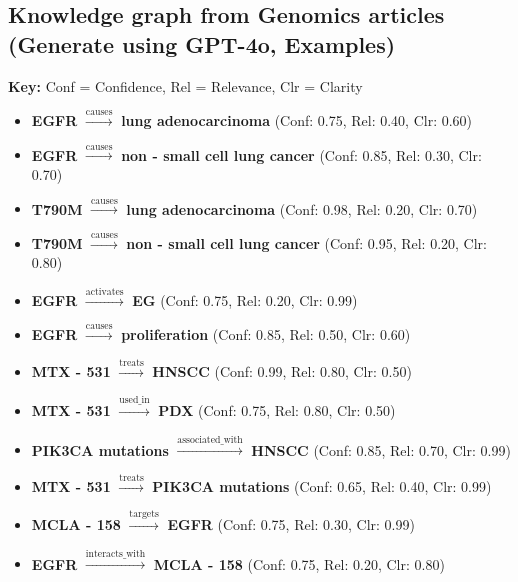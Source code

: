 \documentclass{article}
\begin{document}
\subsection{Knowledge graph from Genomics articles (Generate using GPT-4o, Examples)}
\label{subsec:kg-genomics}
\vspace{2mm}
\begin{tcolorbox}[
    colframe=black!25,
    colback=black!5,
    boxrule=0.5pt,
    arc=2pt,
    title=Genomics Knowledge Graph Triples,
    fonttitle=\bfseries,
    coltitle=black,
    ]
\small
\textbf{Key:} Conf = Confidence, Rel = Relevance, Clr = Clarity\\
\begin{itemize}
    \item \textbf{EGFR} $\xrightarrow{\text{causes}}$ \textbf{lung adenocarcinoma} (Conf: 0.75, Rel: 0.40, Clr: 0.60)
    \item \textbf{EGFR} $\xrightarrow{\text{causes}}$ \textbf{non - small cell lung cancer} (Conf: 0.85, Rel: 0.30, Clr: 0.70)
    \item \textbf{T790M} $\xrightarrow{\text{causes}}$ \textbf{lung adenocarcinoma} (Conf: 0.98, Rel: 0.20, Clr: 0.70)
    \item \textbf{T790M} $\xrightarrow{\text{causes}}$ \textbf{non - small cell lung cancer} (Conf: 0.95, Rel: 0.20, Clr: 0.80)
    \item \textbf{EGFR} $\xrightarrow{\text{activates}}$ \textbf{EG} (Conf: 0.75, Rel: 0.20, Clr: 0.99)
    \item \textbf{EGFR} $\xrightarrow{\text{causes}}$ \textbf{proliferation} (Conf: 0.85, Rel: 0.50, Clr: 0.60)
    \item \textbf{MTX - 531} $\xrightarrow{\text{treats}}$ \textbf{HNSCC} (Conf: 0.99, Rel: 0.80, Clr: 0.50)
    \item \textbf{MTX - 531} $\xrightarrow{\text{used\_in}}$ \textbf{PDX} (Conf: 0.75, Rel: 0.80, Clr: 0.50)
    \item \textbf{PIK3CA mutations} $\xrightarrow{\text{associated\_with}}$ \textbf{HNSCC} (Conf: 0.85, Rel: 0.70, Clr: 0.99)
    \item \textbf{MTX - 531} $\xrightarrow{\text{treats}}$ \textbf{PIK3CA mutations} (Conf: 0.65, Rel: 0.40, Clr: 0.99)
    \item \textbf{MCLA - 158} $\xrightarrow{\text{targets}}$ \textbf{EGFR} (Conf: 0.75, Rel: 0.30, Clr: 0.99)
    \item \textbf{EGFR} $\xrightarrow{\text{interacts\_with}}$ \textbf{MCLA - 158} (Conf: 0.75, Rel: 0.20, Clr: 0.80)

\end{itemize}
\end{tcolorbox}
\end{document}
